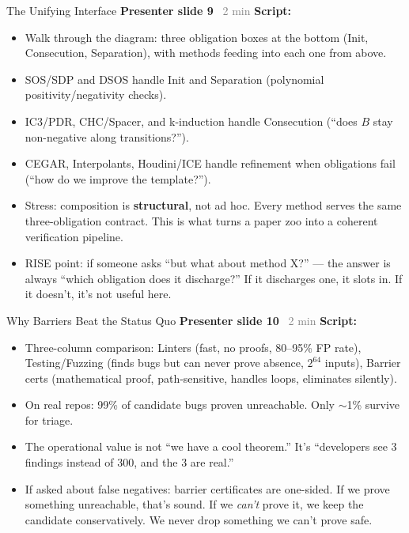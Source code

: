 \documentclass[aspectratio=169]{beamer}
\newcommand{\syncline}[2]{\textbf{#1} \hfill \textcolor{gray}{#2}}
\begin{document}
\begin{frame}{The Unifying Interface}
\syncline{Presenter slide 9}{~2 min}
\textbf{Script:}
\begin{itemize}
  \item Walk through the diagram: three obligation boxes at the bottom (Init, Consecution, Separation), with methods feeding into each one from above.
  \item SOS/SDP and DSOS handle Init and Separation (polynomial positivity/negativity checks).
  \item IC3/PDR, CHC/Spacer, and k-induction handle Consecution (``does $B$ stay non-negative along transitions?'').
  \item CEGAR, Interpolants, Houdini/ICE handle refinement when obligations fail (``how do we improve the template?'').
  \item Stress: composition is \textbf{structural}, not ad hoc. Every method serves the same three-obligation contract. This is what turns a paper zoo into a coherent verification pipeline.
  \item RISE point: if someone asks ``but what about method X?'' --- the answer is always ``which obligation does it discharge?'' If it discharges one, it slots in. If it doesn't, it's not useful here.
\end{itemize}
\end{frame}


\begin{frame}{Why Barriers Beat the Status Quo}
\syncline{Presenter slide 10}{~2 min}
\textbf{Script:}
\begin{itemize}
  \item Three-column comparison: Linters (fast, no proofs, 80--95\% FP rate), Testing/Fuzzing (finds bugs but can never prove absence, $2^{64}$ inputs), Barrier certs (mathematical proof, path-sensitive, handles loops, eliminates silently).
  \item On real repos: 99\% of candidate bugs proven unreachable. Only $\sim$1\% survive for triage.
  \item The operational value is not ``we have a cool theorem.'' It's ``developers see 3 findings instead of 300, and the 3 are real.''
  \item If asked about false negatives: barrier certificates are one-sided. If we prove something unreachable, that's sound. If we \emph{can't} prove it, we keep the candidate conservatively. We never drop something we can't prove safe.
\end{itemize}
\end{frame}
\end{document}
